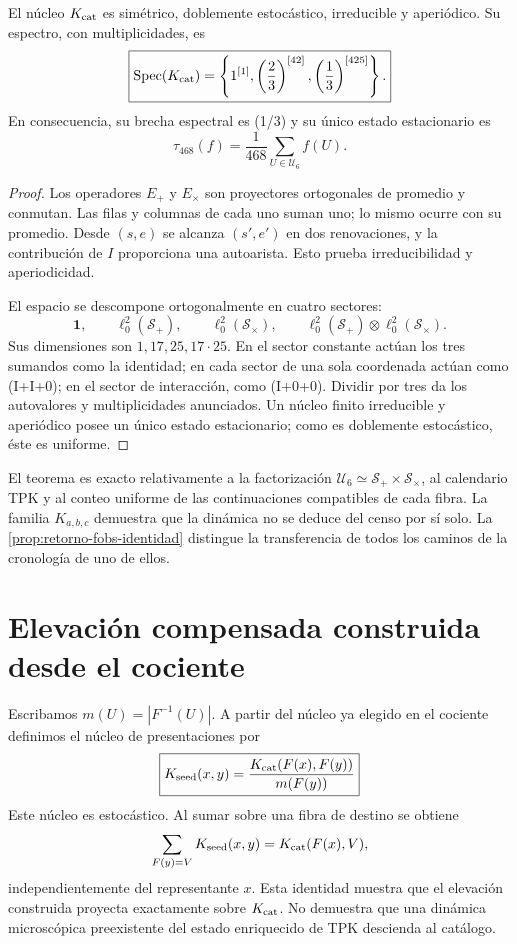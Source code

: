 \begin{theorem}
\label{thm:dinamica-cociente-468}
El núcleo \(K_{\rm cat}\) es simétrico, doblemente estocástico,
irreducible y aperiódico. Su espectro, con multiplicidades, es
\[
 \boxed{
 \operatorname{Spec}(K_{\rm cat})
 =\left\{1^{[1]},
 \left(\frac23\right)^{[42]},
 \left(\frac13\right)^{[425]}\right\}.
 }
\]
En consecuencia, su brecha espectral es (1/3) y su único estado
estacionario es
\[
 \boxed{
 \tau_{468}(f)=\frac1{468}\sum_{U\in\mathcal U_6}f(U).
 }
\]
\end{theorem}

\begin{proof}
Los operadores \(E_+\) y \(E_\times\) son proyectores ortogonales de
promedio y conmutan. Las filas y columnas de cada uno suman uno; lo mismo
ocurre con su promedio. Desde \((s,e)\) se alcanza \((s',e')\) en dos
renovaciones, y la contribución de \(I\) proporciona una autoarista. Esto
prueba irreducibilidad y aperiodicidad.

El espacio se descompone ortogonalmente en cuatro sectores:
\[
 \mathbf1,
 \qquad
 \ell_0^2(\mathcal S_+),
 \qquad
 \ell_0^2(\mathcal S_\times),
 \qquad
 \ell_0^2(\mathcal S_+)\otimes
 \ell_0^2(\mathcal S_\times).
\]
Sus dimensiones son \(1,17,25,17\cdot25\). En el sector constante actúan
los tres sumandos como la identidad; en cada sector de una sola coordenada
actúan como (I+I+0); en el sector de interacción, como (I+0+0).
Dividir por tres da los autovalores y multiplicidades anunciados. Un núcleo
finito irreducible y aperiódico posee un único estado estacionario; como es
doblemente estocástico, éste es uniforme.
\end{proof}

El teorema es exacto relativamente a la factorización
\(\mathcal U_6\simeq\mathcal S_+\times\mathcal S_\times\), al calendario
TPK y al conteo uniforme de las continuaciones compatibles de cada fibra. La
familia \(K_{a,b,c}\) demuestra que la dinámica no se deduce del censo por sí
solo. La \cref{prop:retorno-fobs-identidad} distingue la transferencia de
todos los caminos de la cronología de uno de ellos.

\section{Elevación compensada construida desde el cociente}

Escribamos \(m(U)=|F^{-1}(U)|\). A partir del núcleo ya elegido en el cociente
definimos el núcleo de presentaciones por
\[
 \boxed{
 K_{\rm seed}(x,y)
 =\frac{K_{\rm cat}(F(x),F(y))}{m(F(y))}
 }
\]
Este núcleo es estocástico. Al sumar sobre una fibra de destino se obtiene
\[
 \sum_{F(y)=V}K_{\rm seed}(x,y)
 =K_{\rm cat}(F(x),V),
\]
independientemente del representante \(x\). Esta identidad muestra que el
elevación construida proyecta exactamente sobre \(K_{\rm cat}\). No demuestra que
una dinámica microscópica preexistente del estado enriquecido de TPK descienda
al catálogo.

